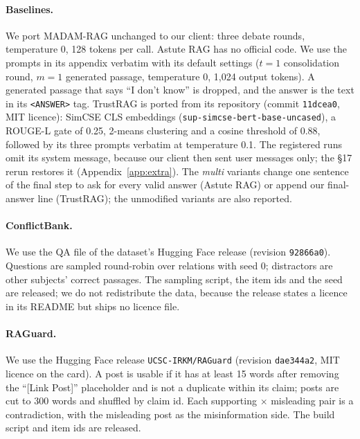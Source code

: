 \paragraph{Baselines.} We port MADAM-RAG unchanged to our client: three debate rounds, temperature 0, 128 tokens
per call. Astute RAG has no official code. We use the prompts in its appendix verbatim with its default
settings ($t{=}1$ consolidation round, $m{=}1$ generated passage, temperature 0, 1,024 output tokens). A generated
passage that says ``I don't know'' is dropped, and the answer is the text in its \texttt{<ANSWER>} tag. TrustRAG is
ported from its repository (commit \texttt{11dcea0}, MIT licence): SimCSE CLS embeddings
(\texttt{sup-simcse-bert-base-uncased}), a ROUGE-L gate of 0.25, 2-means clustering and a cosine threshold of 0.88,
followed by its three prompts verbatim at temperature 0.1. The registered runs omit its system message, because our client then sent
user messages only; the \S17 rerun restores it (Appendix~\ref{app:extra}). The \emph{multi} variants change one sentence of the final step to ask for every valid answer
(Astute RAG) or append our final-answer line (TrustRAG); the unmodified variants are also reported.

\paragraph{ConflictBank.} We use the QA file of the dataset's Hugging Face release (revision \texttt{92866a0}). Questions are sampled round-robin over relations with seed 0; distractors are other subjects' correct passages. The
sampling script, the item ids and the seed are released; we do not redistribute the data, because the release states
a licence in its README but ships no licence file.

\paragraph{RAGuard.} We use the Hugging Face release \texttt{UCSC-IRKM/RAGuard} (revision \texttt{dae344a2}, MIT
licence on the card). A post is usable if it has at least 15 words after removing the ``[Link Post]'' placeholder and is
not a duplicate within its claim; posts are cut to 300 words and shuffled by claim id. Each supporting $\times$ misleading
pair is a contradiction, with the misleading post as the misinformation side. The build script and item ids are
released.


